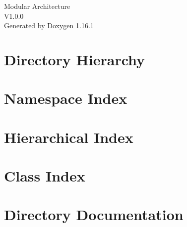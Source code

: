 \documentclass[twoside]{book}
\newcommand{\+}{\discretionary{\mbox{\scriptsize$\hookleftarrow$}}{}{}}
\newcommand{\clearemptydoublepage}{%
    \newpage{\pagestyle{empty}\cleardoublepage}%
  }
\begin{document}
  \raggedbottom
    \hypersetup{pageanchor=false,
                bookmarksnumbered=true,
                pdfencoding=unicode
               }
  \begin{titlepage}
  \vspace*{7cm}
  \begin{center}%
  {\Large Modular Architecture}\\
  [1ex]\large V1.\+0.\+0 \\
  \vspace*{1cm}
  {\large Generated by Doxygen 1.16.1}\\
  \end{center}
  \end{titlepage}
  \clearemptydoublepage
  \tableofcontents
  \clearemptydoublepage
  \hypersetup{pageanchor=true}







\chapter{Directory Hierarchy}

\chapter{Namespace Index}

\chapter{Hierarchical Index}

\chapter{Class Index}

\chapter{Directory Documentation}










\end{document}
